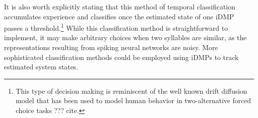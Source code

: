 It is also worth explicitly stating
that this method of temporal classification
accumulates experience and classifies
once the estimated state of one iDMP
passes a threshold.\footnote{
  This type of decision making is reminiscent
  of the well known drift diffusion model
  that has been used to model
  human behavior in two-alternative forced choice tasks
  ??? cite.}
While this classification method
is straightforward to implement,
it may make arbitrary choices
when two syllables are similar,
as the representations resulting
from spiking neural networks are noisy.
More sophisticated classification methods
could be employed using
iDMPs to track estimated system states.

